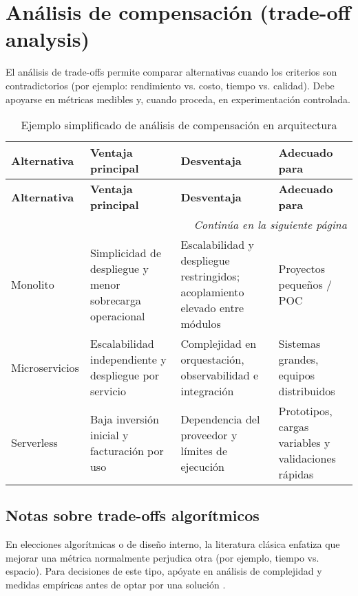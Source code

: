 \section{Análisis de compensación (trade-off analysis)}
El análisis de trade-offs permite comparar alternativas cuando los criterios son contradictorios (por ejemplo: rendimiento vs. costo, tiempo vs. calidad). Debe apoyarse en métricas medibles y, cuando proceda, en experimentación controlada.

\begin{longtable}{p{3cm} p{4cm} p{4cm} p{4cm}}
\caption{Ejemplo simplificado de análisis de compensación en arquitectura} \\
\toprule
\textbf{Alternativa} & \textbf{Ventaja principal} & \textbf{Desventaja} & \textbf{Adecuado para} \\
\midrule
\endfirsthead

\toprule
\textbf{Alternativa} & \textbf{Ventaja principal} & \textbf{Desventaja} & \textbf{Adecuado para} \\
\midrule
\endhead

\multicolumn{4}{r}{\textit{Continúa en la siguiente página}} \\
\endfoot

\bottomrule
\endlastfoot

Monolito & Simplicidad de despliegue y menor sobrecarga operacional & Escalabilidad y despliegue restringidos; acoplamiento elevado entre módulos & Proyectos pequeños / POC \\

Microservicios & Escalabilidad independiente y despliegue por servicio & Complejidad en orquestación, observabilidad e integración & Sistemas grandes, equipos distribuidos \\

Serverless & Baja inversión inicial y facturación por uso & Dependencia del proveedor y límites de ejecución & Prototipos, cargas variables y validaciones rápidas \\
\end{longtable}

\subsection*{Notas sobre trade-offs algorítmicos}
En elecciones algorítmicas o de diseño interno, la literatura clásica enfatiza que mejorar una métrica normalmente perjudica otra (por ejemplo, tiempo vs. espacio). Para decisiones de este tipo, apóyate en análisis de complejidad y medidas empíricas antes de optar por una solución \parencite{clrs2009,knuth1997}.

